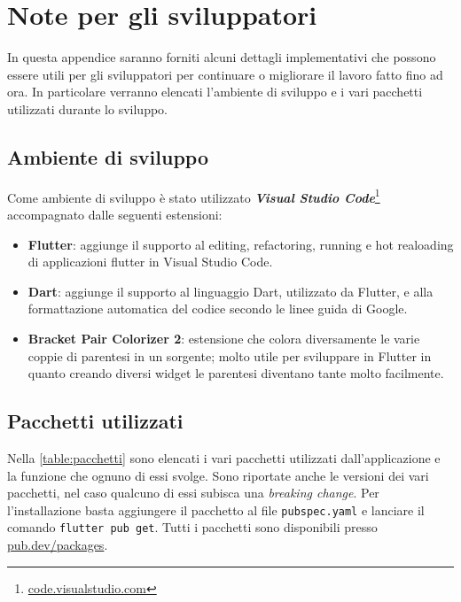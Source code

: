 \chapter{Note per gli sviluppatori}
In questa appendice saranno forniti alcuni dettagli implementativi che possono essere utili per gli sviluppatori per continuare o migliorare il lavoro fatto fino ad ora. In particolare verranno elencati l'ambiente di sviluppo e i vari pacchetti utilizzati durante lo sviluppo.

\section{Ambiente di sviluppo}
Come ambiente di sviluppo è stato utilizzato \textbf{\textit{Visual Studio Code}}\footnote{\url{code.visualstudio.com}} accompagnato dalle seguenti estensioni:
\begin{itemize}
\item \textbf{Flutter}: aggiunge il supporto al editing, refactoring, running e hot realoading di applicazioni flutter in Visual Studio Code.
\item \textbf{Dart}: aggiunge il supporto al linguaggio Dart, utilizzato da Flutter, e alla formattazione automatica del codice secondo le linee guida di Google.
\item \textbf{Bracket Pair Colorizer 2}: estensione che colora diversamente le varie coppie di parentesi in un sorgente; molto utile per sviluppare in Flutter in quanto creando diversi widget le parentesi diventano tante molto facilmente.
\end{itemize}

\section{Pacchetti utilizzati}
Nella \autoref{table:pacchetti} sono elencati i vari pacchetti utilizzati dall'applicazione e la funzione che ognuno di essi svolge. Sono riportate anche le versioni dei vari pacchetti, nel caso qualcuno di essi subisca una \textit{breaking change}. Per l'installazione basta aggiungere il pacchetto al file \texttt{pubspec.yaml} e lanciare il comando \texttt{flutter pub get}. Tutti i pacchetti sono disponibili presso \url{pub.dev/packages}.

